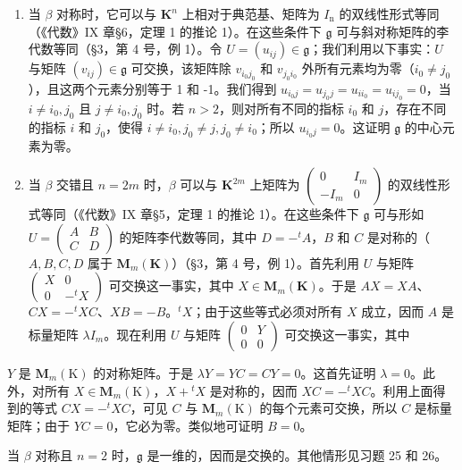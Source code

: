 \begin{enumerate}
\def\labelenumi{(\alph{enumi})}
\item
  当 \(\beta\) 对称时，它可以与 \(\mathbf{K}^n\) 上相对于典范基、矩阵为 \(I_{\mathrm{n}}\) 的双线性形式等同（《代数》IX 章§6，定理 1 的推论 1）。在这些条件下 \(\mathfrak{g}\) 可与斜对称矩阵的李代数等同（§3，第 4 号，例 1）。令 \(U = (u_{ij}) \in \mathfrak{g}\)；我们利用以下事实：\(U\) 与矩阵 \((v_{ij}) \in \mathfrak{g}\) 可交换，该矩阵除 \(v_{i_0j_0}\) 和 \(v_{j_0i_0}\) 外所有元素均为零（\(i_0 \neq j_0\)），且这两个元素分别等于 1 和 -1。我们得到 \(u_{i_0j} = u_{j_0j} = u_{ii_0} = u_{ij_0} = 0\)，当 \(i \neq i_0, j_0\) 且 \(j \neq i_0, j_0\) 时。若 \(n > 2\)，则对所有不同的指标 \(i_0\) 和 \(j\)，存在不同的指标 \(i\) 和 \(j_0\)，使得 \(i \neq i_0, j_0 \neq j, j_0 \neq i_0\)；所以 \(u_{i_0j} = 0\)。这证明 \(\mathfrak{g}\) 的中心元素为零。
\item
  当 \(\beta\) 交错且 \(n = 2m\) 时，\(\beta\) 可以与 \(\mathbf{K}^{2m}\) 上矩阵为 \(\left( \begin{array}{cc}0 & I_m \\ -I_m & 0 \end{array} \right)\) 的双线性形式等同（《代数》IX 章§5，定理 1 的推论 1）。在这些条件下 \(\mathfrak{g}\) 可与形如 \(U = \left( \begin{array}{cc}A & B\\ C & D \end{array} \right)\) 的矩阵李代数等同，其中 \(D = -^t A\)，\(B\) 和 \(C\) 是对称的（\(A, B, C, D\) 属于 \(\mathbf{M}_m(\mathbf{K})\)）（§3，第 4 号，例 1）。首先利用 \(U\) 与矩阵 \(\left( \begin{array}{cc}X & 0 \\ 0 & -^t X \end{array} \right)\) 可交换这一事实，其中 \(X \in \mathbf{M}_m(\mathbf{K})\)。于是 \(AX = X A\)、\(CX = -^t XC\)、\(XB = -B\)。\(^t X\)；由于这些等式必须对所有 \(X\) 成立，因而 \(A\) 是标量矩阵 \(\lambda I_m\)。现在利用 \(U\) 与矩阵 \(\left( \begin{array}{cc}0 & Y \\ 0 & 0 \end{array} \right)\) 可交换这一事实，其中
\end{enumerate}

\(Y\) 是 \(\mathbf{M}_m(\mathrm{K})\) 的对称矩阵。于是 \(\lambda Y = YC = CY = 0\)。这首先证明 \(\lambda = 0\)。此外，对所有 \(X \in \mathbf{M}_m(\mathrm{K})\)，\(X + {}^t X\) 是对称的，因而 \(XC = -{}^t XC\)。利用上面得到的等式 \(CX = -{}^t XC\)，可见 \(C\) 与 \(\mathbf{M}_m(\mathrm{K})\) 的每个元素可交换，所以 \(C\) 是标量矩阵；由于 \(YC = 0\)，它必为零。类似地可证明 \(B = 0\)。

当 \(\beta\) 对称且 \(n = 2\) 时，\(\mathfrak{g}\) 是一维的，因而是交换的。其他情形见习题 25 和 26。

